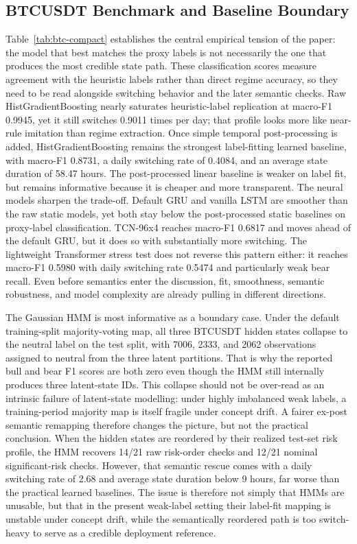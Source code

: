 \documentclass[a4paper,fleqn]{cas-dc}
\begin{document}
\subsection{BTCUSDT Benchmark and Baseline Boundary}
Table~\ref{tab:btc-compact} establishes the central empirical tension of the paper: the model that best matches the proxy labels is not necessarily the one that produces the most credible state path. These classification scores measure agreement with the heuristic labels rather than direct regime accuracy, so they need to be read alongside switching behavior and the later semantic checks. Raw HistGradientBoosting nearly saturates heuristic-label replication at macro-F1 0.9945, yet it still switches 0.9011 times per day; that profile looks more like near-rule imitation than regime extraction. Once simple temporal post-processing is added, HistGradientBoosting remains the strongest label-fitting learned baseline, with macro-F1 0.8731, a daily switching rate of 0.4084, and an average state duration of 58.47 hours. The post-processed linear baseline is weaker on label fit, but remains informative because it is cheaper and more transparent. The neural models sharpen the trade-off. Default GRU and vanilla LSTM are smoother than the raw static models, yet both stay below the post-processed static baselines on proxy-label classification. TCN-96x4 reaches macro-F1 0.6817 and moves ahead of the default GRU, but it does so with substantially more switching. The lightweight Transformer stress test does not reverse this pattern either: it reaches macro-F1 0.5980 with daily switching rate 0.5474 and particularly weak bear recall. Even before semantics enter the discussion, fit, smoothness, semantic robustness, and model complexity are already pulling in different directions.

The Gaussian HMM is most informative as a boundary case. Under the default training-split majority-voting map, all three BTCUSDT hidden states collapse to the neutral label on the test split, with 7006, 2333, and 2062 observations assigned to neutral from the three latent partitions. That is why the reported bull and bear F1 scores are both zero even though the HMM still internally produces three latent-state IDs. This collapse should not be over-read as an intrinsic failure of latent-state modelling: under highly imbalanced weak labels, a training-period majority map is itself fragile under concept drift. A fairer ex-post semantic remapping therefore changes the picture, but not the practical conclusion. When the hidden states are reordered by their realized test-set risk profile, the HMM recovers 14/21 raw risk-order checks and 12/21 nominal significant-risk checks. However, that semantic rescue comes with a daily switching rate of 2.68 and average state duration below 9 hours, far worse than the practical learned baselines. The issue is therefore not simply that HMMs are unusable, but that in the present weak-label setting their label-fit mapping is unstable under concept drift, while the semantically reordered path is too switch-heavy to serve as a credible deployment reference.
\end{document}
